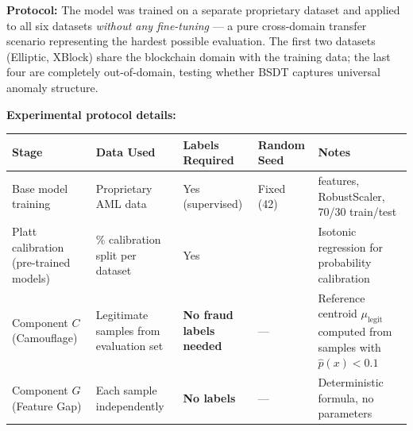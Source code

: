\documentclass[
  11pt,
]{article}
\newcounter{none} %
\begin{document}
\textbf{Protocol:} The model was trained on a separate proprietary
dataset and applied to all six datasets \emph{without any fine-tuning} —
a pure cross-domain transfer scenario representing the hardest possible
evaluation. The first two datasets (Elliptic, XBlock) share the
blockchain domain with the training data; the last four are completely
out-of-domain, testing whether BSDT captures universal anomaly
structure.

\textbf{Experimental protocol details:}

{\def\LTcaptype{none} %
\begin{longtable}[]{@{}
  >{\raggedright\arraybackslash}p{}
  >{\raggedright\arraybackslash}p{}
  >{\raggedright\arraybackslash}p{}
  >{\raggedright\arraybackslash}p{}
  >{\raggedright\arraybackslash}p{}@{}}
\toprule\noalign{}
\begin{minipage}[b]{\linewidth}\raggedright
Stage
\end{minipage} & \begin{minipage}[b]{\linewidth}\raggedright
Data Used
\end{minipage} & \begin{minipage}[b]{\linewidth}\raggedright
Labels Required
\end{minipage} & \begin{minipage}[b]{\linewidth}\raggedright
Random Seed
\end{minipage} & \begin{minipage}[b]{\linewidth}\raggedright
Notes
\end{minipage} \\
\midrule\noalign{}
\endhead
\bottomrule\noalign{}
\endlastfoot
Base model training & Proprietary AML data & Yes (supervised) & Fixed
(42) & 93 features, RobustScaler, 70/30 train/test \\
Platt calibration (pre-trained models) & 20\% calibration split per
dataset & Yes & 42 & Isotonic regression for probability calibration \\
Component \(C\) (Camouflage) & Legitimate samples from evaluation set &
\textbf{No fraud labels needed} & — & Reference centroid
\(\mu_{\text{legit}}\) computed from samples with
\(\hat{p}(x) < 0.1\) \\
Component \(G\) (Feature Gap) & Each sample independently & \textbf{No
labels} & — & Deterministic formula, no parameters \\

\end{longtable}}
\end{document}
